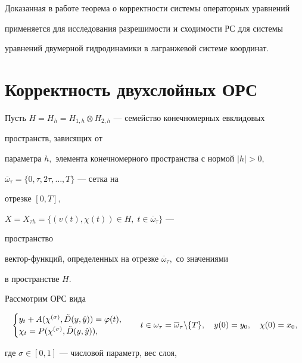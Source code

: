  


Доказанная в работе теорема о корректности системы операторных уравнений 


применяется для исследования разрешимости и сходимости РС для системы 


уравнений двумерной гидродинамики в лагранжевой системе координат. 


 


\section{Корректность двухслойных ОРС} 


 


Пусть $H=H_h=H_{1,h}\otimes H_{2,h}$ --- семейство конечномерных евклидовых 


пространств, зависящих от 


параметра $h,$ элемента конечномерного пространства с нормой $|h|>0,$ 


$\overline \omega_\tau=\{0,\tau,2\tau,\dotsc,T\}$ --- сетка на 


отрезке $[0,T],$ 


$X=X_{\tau h}=\{(v(t),\chi(t))\in H,\;t\in\overline\omega_\tau\}$ --- 


пространство 


вектор-функций, определенных на отрезке $\overline\omega_\tau,$ со значениями 


в пространстве $H.$ 


 


Рассмотрим ОРС вида 


\begin{equation} 


\begin{cases} 


y_t+A(\chi^{(\sigma)},\Tilde D(y,\Hat y))=\varphi(t),\\ 


\chi_t=P(\chi^{(\sigma)},\Tilde D(y,\Hat y)), 


\end{cases} 


\quad 


t\in\omega_\tau=\overline\omega_\tau\backslash\{T\}, \quad 


y(0)=y_0,\quad \chi(0)=x_0,


\end{equation} 


где $\sigma\in[0,1]$ --- числовой параметр, вес слоя, 


